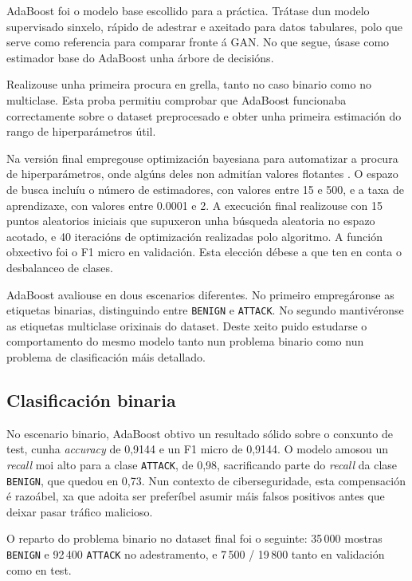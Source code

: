\documentclass[12pt,a4paper]{article}
\begin{document}
AdaBoost foi o modelo base escollido para a práctica. Trátase dun modelo
supervisado sinxelo, rápido de adestrar e axeitado para datos tabulares, polo
que serve como referencia para comparar fronte á GAN. No que segue, úsase como estimador base do AdaBoost unha árbore de decisións. 

Realizouse unha primeira procura en grella,
tanto no caso binario como no multiclase. Esta proba permitiu comprobar que
AdaBoost funcionaba correctamente sobre o dataset preprocesado e obter unha
primeira estimación do rango de hiperparámetros útil.

Na versión final empregouse optimización bayesiana para automatizar
a procura de hiperparámetros, onde algúns deles non admitían valores flotantes \cite{bayopt,Garrido_Merch_n_2020}. O espazo de busca incluíu o número de estimadores, con valores entre 15 e 500,
e a taxa de aprendizaxe, con valores entre 0.0001 e 2. A execución final realizouse con 15 puntos aleatorios iniciais que supuxeron unha búsqueda aleatoria 
no espazo acotado, e 40 iteracións de optimización realizadas polo algoritmo. A función obxectivo foi o F1 micro en
validación. Esta elección débese a que ten en conta o desbalanceo de clases.

AdaBoost avaliouse en dous escenarios diferentes. No primeiro empregáronse
as etiquetas binarias, distinguindo entre \texttt{BENIGN} e \texttt{ATTACK}.
No segundo mantivéronse as etiquetas multiclase orixinais do dataset. Deste
xeito puido estudarse o comportamento do mesmo modelo tanto nun problema
binario como nun problema de clasificación máis detallado.

\subsection{Clasificación binaria}

No escenario binario, AdaBoost obtivo un resultado sólido sobre o conxunto de
test, cunha \emph{accuracy} de 0,9144 e un F1 micro de 0,9144. O modelo
amosou un \emph{recall} moi alto para a clase \texttt{ATTACK}, de 0,98,
sacrificando parte do \emph{recall} da clase \texttt{BENIGN}, que quedou en
0,73. Nun contexto de ciberseguridade, esta compensación é razoábel, xa que
adoita ser preferíbel asumir máis falsos positivos antes que deixar pasar
tráfico malicioso.

O reparto do problema binario no dataset final foi o seguinte:
35\,000 mostras \texttt{BENIGN} e 92\,400 \texttt{ATTACK} no adestramento,
e 7\,500 / 19\,800 tanto en validación como en test.
\end{document}
